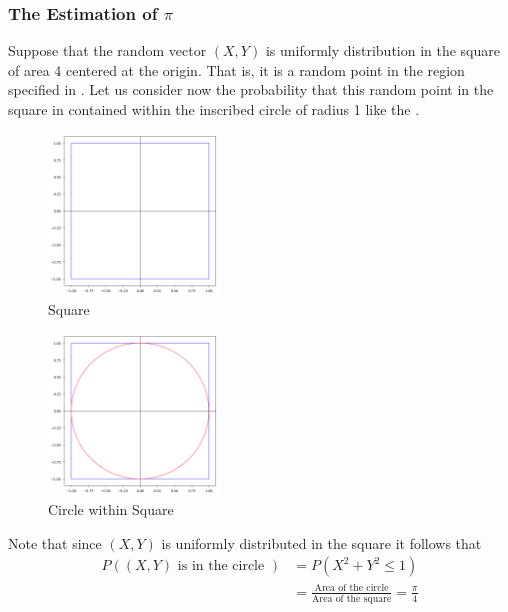 \newpage
\subsubsection{The Estimation of $\pi$}
Suppose that the random vector $(X,Y)$ is uniformly distribution in the square of area 4
centered at the origin. That is, it is a random point in the region specified in .
Let us consider now the probability that this random point in the square in contained within the inscribed circle of radius 1
like the .

\begin{figure}[H]
	\centering
	\includegraphics[width=0.4\textwidth]{images/square.png}
	\caption{Square}
	\label{Square}
\end{figure}

\begin{figure}[H]
	\centering
	\includegraphics[width=0.4\textwidth]{images/circle.png}
	\caption{Circle within Square}
	\label{Circle within Square}
\end{figure}

Note that since $(X,Y)$ is uniformly distributed in the square it follows that
\begin{align*}
	P((X,Y) \text{ is in the circle } ) & = P(X ^{2}+ Y ^{2}\le 1)                                                        \\
	                                    & = \frac{\text{Area of the circle} }{\text{Area of the square} } = \frac{\pi}{4}
\end{align*}

